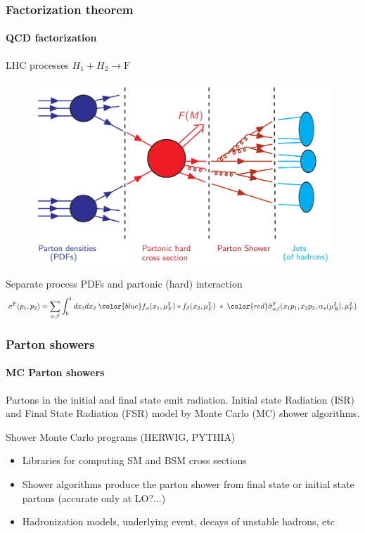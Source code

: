 \documentclass[aspectratio=43]{beamer}
\begin{document}
\begin{frame}

	\frametitle{Factorization theorem}
	\framesubtitle{QCD factorization}
	
	\center \footnotesize LHC processes $H_{1} + H_{2} \rightarrow \textrm{F}$	
	\begin{figure}
		\includegraphics[width = 7 cm]{plots/factorization_1.png}
	\end{figure}
	
	\footnotesize {Separate process {\color{blue}PDFs} and {\color{red} partonic (hard) interaction}	
	\begin{equation}
		\sigma^{\textrm{F}}(p_{1}, p_{2}) = \sum_{\alpha, \beta}
		\int_{0}^{1} dx_{1} dx_{2} \; {\color{blue} f_{\alpha}(x_{1}, \mu_{F}^{2}) \ast f_{\beta}(x_{2}, \mu_{F}^{2})}
		\; \ast \;  
		{\color{red}\hat{\sigma}^{\textrm{F}}_{\alpha \beta}(x_{1}p_{1}, x_{2}p_{2}, \alpha_{s}(\mu_{R}^{2}), \mu_{F}^{2})} \nonumber
	\end{equation}}
		
\end{frame}

\begin{frame}

	\frametitle{Parton showers}
	\framesubtitle{MC Parton showers}
	
	\footnotesize Partons in the initial and final state emit radiation. Initial state Radiation (ISR) and Final State Radiation (FSR) model by Monte Carlo (MC) shower algorithms.
	
	\vspace{0.1 cm}
	\center \color{red} Shower Monte Carlo programs (HERWIG, PYTHIA)
	\vspace{0.15 cm}
	
	\begin{itemize} 
		\item Libraries for computing SM and BSM cross sections
		\item Shower algorithms produce the parton shower from final state or initial state partons (accurate only at LO?...)
		\item Hadronization models, underlying event, decays of unstable hadrons, etc
	\end{itemize}

\end{frame}
\end{document}
